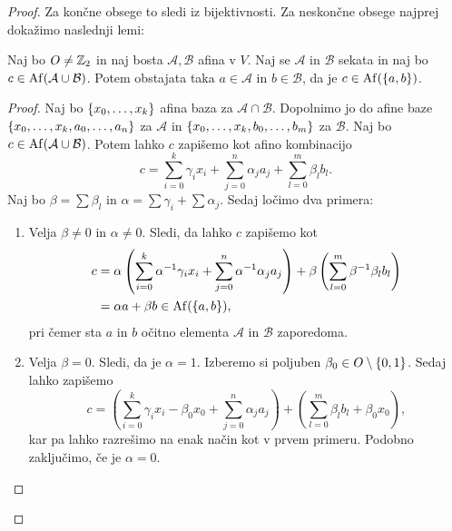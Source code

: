 \begin{proof}
    Za končne obsege to sledi iz bijektivnosti. Za neskončne obsege najprej dokažimo naslednji lemi:

\begin{lema*}
    Naj bo $O \neq \mathbb{Z}_2$ in naj bosta $\mathcal{A}, \mathcal{B}$ afina v $V$. Naj se $\mathcal{A}$ in $\mathcal{B}$ sekata in naj bo $c \in \operatorname{Af} (\mathcal{A} \cup \mathcal{B})$. Potem obstajata taka $a \in \mathcal{A}$ in $b \in \mathcal{B}$,
    da je $c \in \operatorname{Af} (\left\{a,b\right\})$.
\end{lema*}

\begin{proof}
    Naj bo $\left\{x_0, \dots, x_k\right\}$ afina baza za $\mathcal{A} \cap \mathcal{B}$. Dopolnimo jo do afine baze \\
    $\left\{x_0, \dots, x_k, a_0, \dots, a_n\right\}$ za $\mathcal{A}$ in $\left\{x_0, \dots, x_k, b_0, \dots, b_m\right\}$ za $\mathcal{B}$.
    Naj bo $c \in \operatorname{Af} (\mathcal{A} \cup \mathcal{B})$. Potem lahko $c$ zapišemo kot afino kombinacijo
    \[
    c = \sum_{i=0}^k \gamma_i x_i + \sum_{j=0}^n \alpha_j a_j + \sum_{l=0}^m \beta_l b_l.
    \]
    Naj bo $\beta = \sum \beta_l$ in $\alpha = \sum \gamma_i + \sum \alpha_j$. Sedaj ločimo dva primera:
    
    \begin{enumerate}
        \item Velja $\beta \neq 0$ in $\alpha \neq 0$. Sledi, da lahko $c$ zapišemo kot
        \begin{align*}
          c &= \alpha \left(\sum_{i=0}^k \alpha^{-1} \gamma_i x_i + \sum_{j=0}^n \alpha^{-1} \alpha_j a_j\right) + \beta \left(\sum_{l=0}^m \beta^{-1} \beta_l b_l\right) \\
          &= \alpha a + \beta b \in \operatorname{Af} (\left\{a,b\right\}),
        \end{align*}
        pri čemer sta $a$ in $b$ očitno elementa $\mathcal{A}$ in $\mathcal{B}$ zaporedoma.
        \item Velja $\beta = 0$. Sledi, da je $\alpha = 1$. Izberemo si poljuben $\beta_0 \in O \setminus \left\{0,1\right\}$. Sedaj lahko zapišemo
        \[
            c = \left(\sum_{i=0}^k \gamma_i x_i - \beta_0 x_0 + \sum_{j=0}^n \alpha_j a_j\right) + \left(\sum_{l=0}^m \beta_l b_l + \beta_0 x_0\right),
        \]
        kar pa lahko razrešimo na enak način kot v prvem primeru. Podobno zaključimo, če je $\alpha = 0$. \qedhere
    \end{enumerate}
\end{proof}


\end{proof}
